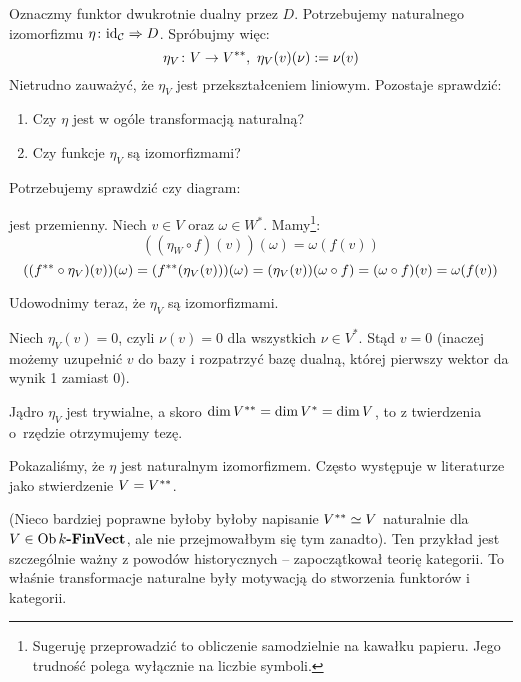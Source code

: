 {\begin{prof}
  Oznaczmy funktor dwukrotnie dualny przez $D$. Potrzebujemy naturalnego izomorfizmu $\eta\colon \mathrm{id}_{\mathcal C}\Rightarrow D$. Spróbujmy więc:
  $$\eta_V\colon V\to {V}^{**},~\eta_V(v)(\nu) := \nu(v)$$
  Nietrudno zauważyć, że $\eta_V$ jest przekształceniem liniowym. Pozostaje sprawdzić:
  \begin{enumerate}
    \item Czy $\eta$ jest w ogóle transformacją naturalną?
    \item Czy funkcje $\eta_V$ są izomorfizmami?
  \end{enumerate}
  Potrzebujemy sprawdzić czy diagram:
  \begin{center}
  \end{center}
  jest przemienny. Niech $v\in V$ oraz $\omega\in W^*$. Mamy\footnote{Sugeruję przeprowadzić to obliczenie samodzielnie na kawałku papieru. Jego trudność polega wyłącznie na liczbie symboli.}:
  $$((\eta_W\circ f)(v))(\omega)=\omega(f(v))$$
  $$(({f}^{**}\circ \eta_V)(v))(\omega) = ( {f}^{**}(\eta_V(v)))(\omega) = (\eta_V(v))(\omega\circ f) = (\omega\circ f)(v) = \omega(f(v))$$

  Udowodnimy teraz, że $\eta_V$ są izomorfizmami.

  Niech $\eta_V(v) = 0$, czyli $\nu(v)=0$ dla wszystkich $\nu\in V^*$. Stąd $v=0$ (inaczej możemy uzupełnić $v$ do bazy i rozpatrzyć bazę dualną, której pierwszy wektor da wynik 1 zamiast 0).

  Jądro $\eta_V$ jest trywialne, a skoro $\dim {V}^{**} = \dim {V}^{*} = \dim V$, to z twierdzenia o~rzędzie otrzymujemy tezę.
\end{prof}

\begin{remk}
    Pokazaliśmy, że $\eta$ jest naturalnym izomorfizmem. Często występuje w literaturze jako stwierdzenie $V={V}^{**}$.

    (Nieco bardziej poprawne byłoby byłoby napisanie ${V}^{**}\simeq V$ naturalnie dla $V\in \textrm{Ob\,}{k\textbf{-FinVect}}$, ale nie przejmowałbym się tym zanadto).
    Ten przykład jest szczególnie ważny z powodów historycznych -- zapoczątkował teorię kategorii. To właśnie transformacje naturalne były motywacją do stworzenia funktorów i kategorii.
\end{remk}

}
